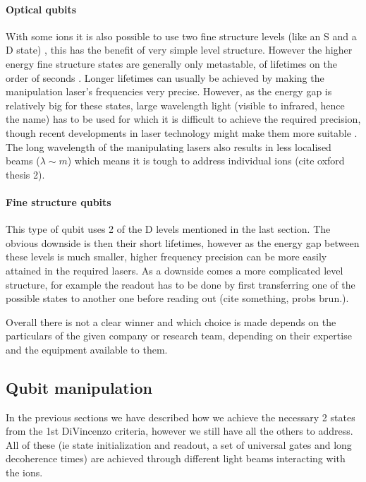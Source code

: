 \paragraph{Optical qubits}
With some ions it is also possible to use two fine structure levels (like an S and a D state) , this has the benefit of very simple level structure.
However the higher energy fine structure states are generally only metastable, of lifetimes on the order of seconds \cite{ozeriTrappedionQubitTool2011}.
Longer lifetimes can usually be achieved by making the manipulation laser's frequencies very precise.
However, as the energy gap is relatively big for these states, large wavelength light (visible to infrared, hence the name) has to be used for which it is difficult to achieve the required precision, though recent developments in laser technology might make them more suitable \cite{bruzewiczTrappedionQuantumComputing2019}.
The long wavelength of the manipulating lasers also results in less localised beams ($\lambda \sim \si{m}$) which means it is tough to address individual ions (cite oxford thesis 2).

\paragraph{Fine structure qubits}
This type of qubit uses 2 of the D levels mentioned in the last section.
The obvious downside is then their short lifetimes, however as the energy gap between these levels is much smaller, higher frequency precision can be more easily attained in the required lasers.
As a downside comes a more complicated level structure, for example the readout has to be done by first transferring one of the possible states to another one before reading out (cite something, probs brun.).


Overall there is not a clear winner and which choice is made depends on the particulars of the given company or research team, depending on their expertise and the equipment available to them.


\subsection{Qubit manipulation}
In the previous sections we have described how we achieve the necessary 2 states from the 1st DiVincenzo criteria, however we still have all the others to address.
All of these (ie state initialization and readout, a set of universal gates and long decoherence times) are achieved through different light beams interacting with the ions.

